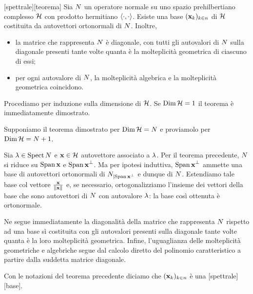 \begin{Corollary}
  [spettrale][teorema] Sia $N$ un
  operatore normale su uno spazio prehilbertiano complesso $\mathcal{H}$
  con prodotto hermitiano $\left \langle \cdot , \cdot \right \rangle$.
  Esiste una base $(\Eigenvector_k)_{k \in n}$ di $\mathcal{H}$ costituita
  da autovettori ortonormali di $N$.
  Inoltre,
  \begin{itemize}
    \item la matrice che rappresenta $N$ \`e diagonale, con tutti
      gli autovalori di $N$ sulla diagonale presenti tante volte
      quanta \`e la molteplicit\`a geometrica di ciascuno di essi;
    \item per ogni autovalore di $N$, la molteplicit\`a algebrica
      e la molteplicit\`a geometrica coincidono.
  \end{itemize}
\end{Corollary}
\Proof Procediamo per induzione sulla dimensione di $\mathcal{H}$.
Se $\operatorname{Dim}{\mathcal{H}} = 1$ il teorema \`e immediatamente
dimostrato.
\par Supponiamo il teorema dimostrato per
$\operatorname{Dim}{\mathcal{H}} = N$
e proviamolo per
$\operatorname{Dim}{\mathcal{H}} = N + 1$.
\par Sia $\lambda \in \operatorname{Spect}{N}$ e
$\Eigenvector \in \PrehilbertSpace$
autovettore associato a $\lambda$. Per il teorema precedente,
$N$ si riduce su $\LinearSpan{\Eigenvector}$ e
$\OrthogonalComplement{\LinearSpan{\Eigenvector}}$.
Ma per ipotesi induttiva,
$\OrthogonalComplement{\LinearSpan{\Eigenvector}}$
ammette una base di autovettori ortonormali di
$\Restricted{\NormalOperator}{\OrthogonalComplement{\LinearSpan{\Eigenvector}}}$
e dunque di $N$. Estendiamo tale base col vettore
$\frac{\Eigenvector}{\Norm{\Eigenvector}}$ e, se necessario, ortogonalizziamo
l'insieme dei vettori della base che sono autovettori di $N$
con autovalore $\lambda$: la base cos\`i ottenuta \`e ortonormale.
\par Ne segue immediatamente la diagonalit\`a della matrice che rappresenta
$N$ rispetto ad una base s\`i costituita con gli autovalori
presenti sulla diagonale tante volte quanta \`e la loro molteplicit\`a
geometrica. Infine, l'uguaglianza delle molteplicit\`a geometriche e algebriche
segue dal calcolo diretto del polinomio caratteristico a partire dalla suddetta
matrice diagonale. \EndProof
\begin{Definition}
  Con le notazioni del teorema precedente diciamo che
  $(\Eigenvector_k)_{k \in n}$ \`e una
  [spettrale][base].
\end{Definition}
